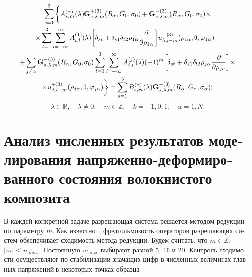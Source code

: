 \begin{russian}
\begin{multline}
\sum\limits_{s = 1}^3 \bigg\{  A_{s,m}^{(\alpha )}(\lambda ){\bf{G}}_{s,\lambda ,m}^{ + (3)}({R_\alpha },{G_0},{\sigma _0}) + {\bf{G}}_{s,\lambda ,m}^{ - (3)}({R_\alpha },{G_0},{\sigma _0}) \times \\
\times \sum\limits_{t = 1}^3 {\sum\limits_{l =  - \infty }^\infty  {A_{t,l}^{(1)}} } (\lambda )\bigg[{\delta _{st}} + {\delta _{s1}}{\delta _{t2}}{\rho _{1\alpha }}\frac{\partial }{{\partial {\rho _{1\alpha }}}}\bigg]u_{\lambda ,l - m}^{ - (3)}({\rho _{1\alpha }},0,{\varphi _{1\alpha }}) + \\
+ \sum\limits_{j \ne \alpha } {{\bf{G}}_{s,\lambda ,m}^{ - (3)}} ({R_\alpha },{G_0},{\sigma _0})\sum\limits_{t = 1}^3 {\sum\limits_{l =  - \infty }^\infty  {A_{t,l}^{(j)}} } (\lambda ){( - 1)^m}\bigg[{\delta _{st}} + {\delta _{s1}}{\delta _{t2}}{\rho _{j\alpha }}\frac{\partial }{{\partial {\rho _{j\alpha }}}}\bigg] \times \\
\times u_{\lambda ,l - m}^{ + (3)}({\rho _{j\alpha }},0,{\varphi _{j\alpha }})\bigg\}  = \sum\limits_{s = 1}^3 {B_{s,m}^{(\alpha )}} (\lambda ){\bf{G}}_{s,\lambda ,m}^{ - (3)}({R_\alpha },{G_\alpha },{\sigma _\alpha });
\end{multline}
$$
\lambda\in\mathbb{R},\quad\lambda\neq 0;\quad m\in\mathbb{Z},\quad k=-1,0,1;\quad\alpha  = \overline {1,N}.
$$

\section[Анализ численных результатов моделирования на\-пря\-же\-н\-но-де\-фор\-ми\-ро\-ва\-н\-но\-го состояния волокнистого композита]{Анализ численных результатов моделирования на\-пря\-же\-н\-но-де\-фор\-ми\-ро\-ва\-н\-но\-го состояния волокнистого композита}

В каждой конкретной задаче разрешающая система решается методом редукции по параметру $m$. Как известно~\cite{Kantorovich}, фредгольмовость операторов разрешающих систем обеспечивает сходимость метода редукции. Будем считать, что $m\in\mathbb{Z}$, $|m|\le m_{max}$. Постоянную $m_{max}$ выбирают равной 5, 10 и 20. Контроль сходимости осуществляют по стабилизации значащих цифр в численных величинах главных напряжений в некоторых точках образца.


\end{russian}
